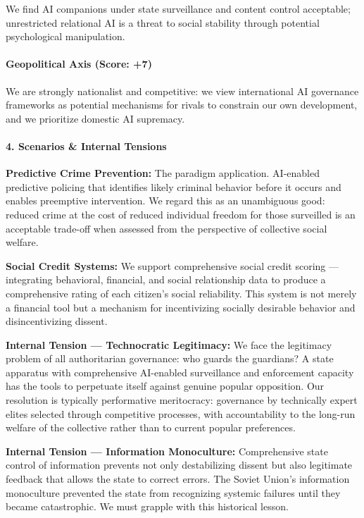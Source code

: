 We find AI companions under state surveillance and content control
acceptable; unrestricted relational AI is a threat to social stability
through potential psychological manipulation.

\paragraph{Geopolitical Axis (Score:
+7)}\label{geopolitical-axis-score-7}

We are strongly nationalist and competitive: we view international AI
governance frameworks as potential mechanisms for rivals to constrain
our own development, and we prioritize domestic AI supremacy.

\paragraph{4. Scenarios \& Internal
Tensions}\label{scenarios-internal-tensions-22}

\textbf{Predictive Crime Prevention:} The paradigm application.
AI-enabled predictive policing that identifies likely criminal behavior
before it occurs and enables preemptive intervention. We regard this as
an unambiguous good: reduced crime at the cost of reduced individual
freedom for those surveilled is an acceptable trade-off when assessed
from the perspective of collective social welfare.

\textbf{Social Credit Systems:} We support comprehensive social credit
scoring --- integrating behavioral, financial, and social relationship
data to produce a comprehensive rating of each citizen's social
reliability. This system is not merely a financial tool but a mechanism
for incentivizing socially desirable behavior and disincentivizing
dissent.

\textbf{Internal Tension --- Technocratic Legitimacy:} We face the
legitimacy problem of all authoritarian governance: who guards the
guardians? A state apparatus with comprehensive AI-enabled surveillance
and enforcement capacity has the tools to perpetuate itself against
genuine popular opposition. Our resolution is typically performative
meritocracy: governance by technically expert elites selected through
competitive processes, with accountability to the long-run welfare of
the collective rather than to current popular preferences.

\textbf{Internal Tension --- Information Monoculture:} Comprehensive
state control of information prevents not only destabilizing dissent but
also legitimate feedback that allows the state to correct errors. The
Soviet Union's information monoculture prevented the state from
recognizing systemic failures until they became catastrophic. We must
grapple with this historical lesson.


